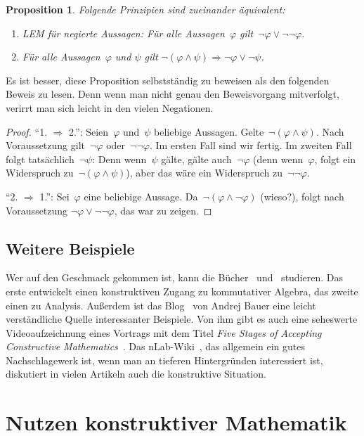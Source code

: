 \documentclass[a4paper,ngerman,12pt]{scrartcl}
\theoremstyle{definition}
\theoremstyle{plain}
\newtheorem{prop}[defn]{Proposition}
\theoremstyle{remark}
\renewcommand{\_}{\mathpunct{.}\,}
\newcommand{\?}{\,{:}\,}
\begin{document}
\begin{prop}Folgende Prinzipien sind zueinander äquivalent:
\begin{enumerate}
\item[1.] LEM für negierte Aussagen: Für alle Aussagen~$\varphi$
gilt~$\neg\varphi \vee \neg\neg\varphi$.
\item[2.] Für alle Aussagen~$\varphi$ und $\psi$ gilt $\neg(\varphi \wedge \psi)
\Longrightarrow \neg\varphi \vee \neg\psi$.
\end{enumerate}
\end{prop}
Es ist besser, diese Proposition selbstständig zu beweisen als den folgenden
Beweis zu lesen. Denn wenn man nicht genau den Beweisvorgang mitverfolgt,
verirrt man sich leicht in den vielen Negationen.
\begin{proof}"`1. $\Rightarrow$ 2."': Seien~$\varphi$ und~$\psi$ beliebige
Aussagen. Gelte~$\neg(\varphi \wedge \psi)$. Nach
Voraussetzung gilt~$\neg\varphi$ oder~$\neg\neg\varphi$. Im ersten Fall sind
wir fertig. Im zweiten Fall folgt tatsächlich~$\neg\psi$: Denn
wenn~$\psi$ gälte, gälte auch~$\neg\varphi$ (denn wenn~$\varphi$, folgt ein
Widerspruch zu~$\neg(\varphi \wedge \psi)$), aber das wäre ein Widerspruch
zu~$\neg\neg\varphi$.

"`2. $\Rightarrow$ 1."': Sei~$\varphi$ eine beliebige Aussage. Da~$\neg(\varphi
\wedge \neg\varphi)$ (wieso?), folgt nach Voraussetzung $\neg\varphi \vee
\neg\neg\varphi$, das war zu zeigen.
\end{proof}


\subsection{Weitere Beispiele}

Wer auf den Geschmack gekommen ist, kann die
Bücher~\cite{mines:richman:ruitenburg} und~\cite{bishop:bridges:bible}
studieren. Das erste entwickelt einen konstruktiven Zugang zu kommutativer Algebra, das
zweite einen zu Analysis. Außerdem ist das Blog~\cite{bauer:blog} von Andrej
Bauer eine leicht verständliche Quelle interessanter Beispiele. Von ihm gibt es
auch eine seheswerte Videoaufzeichnung eines Vortrags mit dem Titel \emph{Five
Stages of Accepting Constructive Mathematics}~\cite{bauer:video}. Das
nLab-Wiki~\cite{nlab}, das allgemein ein gutes Nachschlagewerk ist, wenn man an
tieferen Hintergründen interessiert ist, diskutiert in vielen Artikeln auch die
konstruktive Situation.


\section{Nutzen konstruktiver Mathematik}
\end{document}
